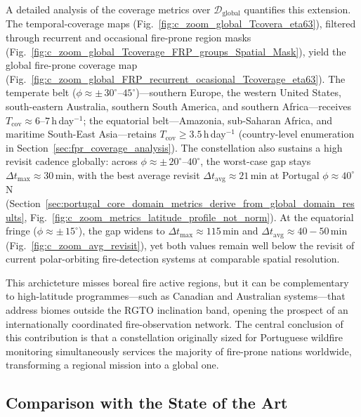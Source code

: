 A detailed analysis of the coverage metrics over $\mathcal{D}_{\mathrm{global}}$ quantifies this extension.  The temporal-coverage maps (Fig.~\ref{fig:c_zoom_global_Tcovera_eta63}), filtered through recurrent and occasional fire-prone region masks (Fig.~\ref{fig:c_zoom_global_Tcoverage_FRP_groups_Spatial_Mask}), yield the global fire-prone coverage map (Fig.~\ref{fig:c_zoom_global_FRP_recurrent_ocasional_Tcoverage_eta63}).  The temperate belt ($\phi \approx \pm\,30^{\circ}$--$45^{\circ}$)---southern Europe, the western United States, south-eastern Australia, southern South America, and southern Africa---receives $T_{\text{cov}} \approx 6$--$7$\,h\,day$^{-1}$; the equatorial belt---Amazonia, sub-Saharan Africa, and maritime South-East Asia---retains $T_{\text{cov}} \geq 3.5$\,h\,day$^{-1}$ (country-level enumeration in Section~\ref{sec:fpr_coverage_analysis}).  The constellation also sustains a high revisit cadence globally: across $\phi \approx \pm\,20^{\circ}$--$40^{\circ}$, the worst-case gap stays $\Delta t_{\max} \approx 30$\,min, with the best average revisit $\Delta t_{\text{avg}} \approx 21$\,min at Portugal $\phi \approx 40^{\circ}$\,N (Section~\ref{sec:portugal_core_domain_metrics_derive_from_global_domain_results}, Fig.~\ref{fig:c_zoom_metrics_latitude_profile_not_norm}).  At the equatorial fringe ($\phi \approx \pm\,15^{\circ}$), the gap widens to $\Delta t_{\max} \approx 115$\,min and $\Delta t_{\text{avg}} \approx 40 - 50$\,min (Fig.~\ref{fig:c_zoom_avg_revisit}), yet both values remain well below the revisit of current polar-orbiting fire-detection systems at comparable spatial resolution.

This archicteture misses boreal fire active regions, but it can be complementary to high-latitude programmes---such as Canadian and Australian systems---that address biomes outside the RGTO inclination band, opening the prospect of an internationally coordinated fire-observation network.  The central conclusion of this contribution is that a constellation originally sized for Portuguese wildfire monitoring simultaneously services the majority of fire-prone nations worldwide, transforming a regional mission into a global one.

\subsection{Comparison with the State of the Art}

